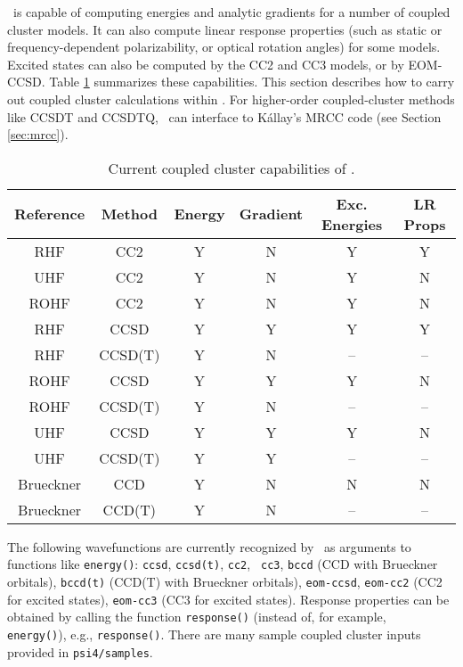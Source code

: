 \PSIfour\ is capable of computing energies and analytic gradients for a
number of coupled cluster models.  It can also compute linear response
properties (such as static or frequency-dependent polarizability,
or optical rotation angles) for some models.  Excited states can
also be computed by the CC2 and CC3 models, or by EOM-CCSD.  Table
\ref{table:ccsummary} summarizes these capabilities.  This section
describes how to carry out coupled cluster calculations within \PSIfour.
For higher-order coupled-cluster methods like CCSDT and CCSDTQ, \PSIfour\
can interface to K{\'a}llay's MRCC code (see Section \ref{sec:mrcc}).


\begin{table}[h]
\begin{center}
\caption{Current coupled cluster capabilities of \PSIfour.}
\label{table:ccsummary}
\begin{tabular}{cccccc}
\hline
\hline
Reference & Method & Energy    & Gradient  &  Exc. Energies & LR Props \\
\hline
RHF       & CC2     & Y & N & Y & Y  \\
UHF       & CC2     & Y & N & Y & N  \\
ROHF      & CC2     & Y & N & Y & N  \\
RHF       & CCSD    & Y & Y & Y & Y  \\
RHF       & CCSD(T) & Y & N & --& -- \\
ROHF      & CCSD    & Y & Y & Y & N  \\
ROHF      & CCSD(T) & Y & N & --& -- \\
UHF       & CCSD    & Y & Y & Y & N  \\
UHF       & CCSD(T) & Y & Y & --& -- \\
Brueckner & CCD     & Y & N & N & N  \\
Brueckner & CCD(T)  & Y & N & --& -- \\
\hline
\hline
\end{tabular}
\end{center}
\end{table}

The following wavefunctions are currently recognized by \PSIfour\ as arguments
to functions like {\tt energy()}: {\tt ccsd}, {\tt ccsd(t)}, {\tt cc2}, {\tt
cc3}, {\tt bccd} (CCD with Brueckner orbitals), {\tt bccd(t)} (CCD(T) with
Brueckner orbitals), {\tt eom-ccsd}, {\tt eom-cc2} (CC2 for excited states),
{\tt eom-cc3} (CC3 for excited states).  Response properties can be obtained
by calling the function {\tt response()} (instead of, for example, {\tt
energy()}), e.g., {\tt response(\qq{ccsd}\qq)}.  There are many sample
coupled cluster inputs provided in {\tt psi4/samples}.


